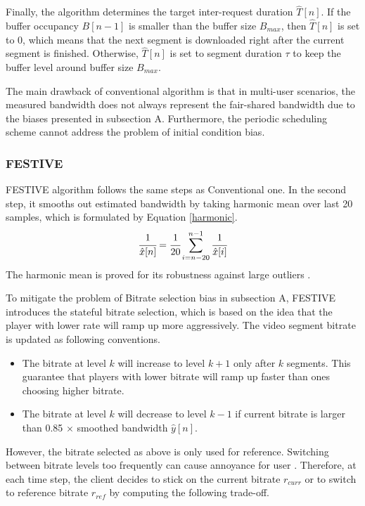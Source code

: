 \documentclass[journal]{IEEEtran}
\begin{document}
\par Finally, the algorithm determines the target inter-request duration $\hat{T}[n]$. If the buffer occupancy $B[n-1]$ is smaller than the buffer size $B_{max}$, then $\hat{T}[n]$ is set to 0, which means that the next segment is downloaded right after the current segment is finished. Otherwise, $\hat{T}[n]$ is set to segment duration $\tau$ to keep the buffer level around buffer size $B_{max}$.
\par The main drawback of conventional algorithm is that in multi-user scenarios, the measured bandwidth does not always represent the fair-shared bandwidth due to the biases presented in subsection A. Furthermore, the periodic scheduling scheme cannot address the problem of initial condition bias. 
\subsubsection{FESTIVE}
FESTIVE algorithm \cite{FESTIVE} follows the same steps as Conventional one. In the second step, it smooths out estimated bandwidth by taking harmonic mean over last 20 samples, which is formulated by Equation \ref{harmonic}.
\begin{equation}
    \cfrac{1}{\hat{x}[n]}=\cfrac{1}{20}\sum_{i=n-20}^{n-1}\cfrac{1}{\hat{x}[i]}
    \label{harmonic}
\end{equation}
The harmonic mean is proved for its robustness against large outliers \cite{harmonic}.
\par To mitigate the problem of Bitrate selection bias in subsection A, FESTIVE introduces the stateful bitrate selection, which is based on the idea that the player with lower rate will ramp up more aggressively. The video segment bitrate is updated as following conventions.
\begin{itemize}
	\item The bitrate at level $k$ will increase to level $k+1$ only after $k$ segments. This guarantee that players with lower bitrate will ramp up faster than ones choosing higher bitrate.
	\item The bitrate at level $k$ will decrease to level $k-1$ if current bitrate is larger than 0.85 $\times$ smoothed bandwidth $\hat{y}[n]$. 
 
\end{itemize}
However, the bitrate selected as above is only used for reference.
Switching between bitrate levels too frequently can cause annoyance for user \cite{switching}. 
Therefore, at each time step, the client decides to stick on the current bitrate $r_{curr}$ or to switch to reference bitrate $r_{ref}$ by computing the following trade-off. 
\end{document}

